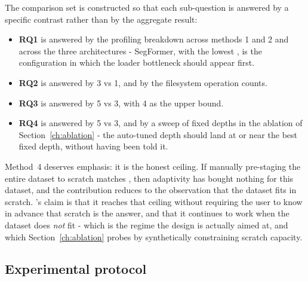 The comparison set is constructed so that each sub-question is answered by a
specific contrast rather than by the aggregate result:

\begin{itemize}
  \item \textbf{RQ1} is answered by the profiling breakdown across methods 1 and 2
    and across the three architectures - SegFormer, with the lowest \Tgpu{}, is
    the configuration in which the loader bottleneck should appear first.
  \item \textbf{RQ2} is answered by 3 vs 1, and by the filesystem operation counts.
  \item \textbf{RQ3} is answered by 5 vs 3, with 4 as the upper bound.
  \item \textbf{RQ4} is answered by 5 vs 3, and by a sweep of fixed depths in the
    ablation of Section~\ref{ch:ablation} - the auto-tuned depth should land at or
    near the best fixed depth, without having been told it.
\end{itemize}

Method~4 deserves emphasis: it is the honest ceiling.
If manually pre-staging the entire dataset to scratch matches \pads{}, then
adaptivity has bought nothing for this dataset, and the contribution reduces to the
observation that the dataset fits in scratch.
\pads{}'s claim is that it reaches that ceiling without requiring the user to know in
advance that scratch is the answer, and that it continues to work when the dataset
does \emph{not} fit - which is the regime the design is actually aimed at, and
which Section~\ref{ch:ablation} probes by synthetically constraining scratch
capacity.

\subsection{Experimental protocol}

